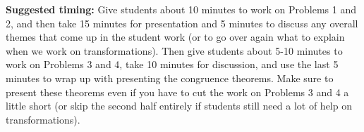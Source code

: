 \documentclass[noauthor, nooutcomes, handout]{ximera}
\begin{document}
\begin{instructorNotes}
{\bf Suggested timing:} Give students about 10 minutes to work on Problems 1 and 2, and then take 15 minutes for presentation and 5 minutes to discuss any overall themes that come up in the student work (or to go over again what to explain when we work on transformations). Then give students about 5-10 minutes to work on Problems 3 and 4, take 10 minutes for discussion, and use the last 5 minutes to wrap up with presenting the congruence theorems. Make sure to present these theorems even if you have to cut the work on Problems 3 and 4 a little short (or skip the second half entirely if students still need a lot of help on transformations).


\end{instructorNotes}
\end{document}
